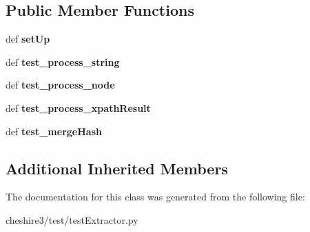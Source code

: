 \subsection*{Public Member Functions}
\begin{DoxyCompactItemize}
\item 
\hypertarget{classcheshire3_1_1test_1_1test_extractor_1_1_simple_extractor_test_case_a14d9efaa07af5961038d73f2e9fd11f6}{def {\bfseries set\-Up}}\label{classcheshire3_1_1test_1_1test_extractor_1_1_simple_extractor_test_case_a14d9efaa07af5961038d73f2e9fd11f6}

\item 
\hypertarget{classcheshire3_1_1test_1_1test_extractor_1_1_simple_extractor_test_case_a39bc2d2c8a2f591b3679b69c2201fffa}{def {\bfseries test\-\_\-process\-\_\-string}}\label{classcheshire3_1_1test_1_1test_extractor_1_1_simple_extractor_test_case_a39bc2d2c8a2f591b3679b69c2201fffa}

\item 
\hypertarget{classcheshire3_1_1test_1_1test_extractor_1_1_simple_extractor_test_case_a0d05adeb98c5d6d1c363b0402624f09f}{def {\bfseries test\-\_\-process\-\_\-node}}\label{classcheshire3_1_1test_1_1test_extractor_1_1_simple_extractor_test_case_a0d05adeb98c5d6d1c363b0402624f09f}

\item 
\hypertarget{classcheshire3_1_1test_1_1test_extractor_1_1_simple_extractor_test_case_ad193b20f5e62d9ac07d4bf438cdb3275}{def {\bfseries test\-\_\-process\-\_\-xpath\-Result}}\label{classcheshire3_1_1test_1_1test_extractor_1_1_simple_extractor_test_case_ad193b20f5e62d9ac07d4bf438cdb3275}

\item 
\hypertarget{classcheshire3_1_1test_1_1test_extractor_1_1_simple_extractor_test_case_ace4fb9fd4a5799941082b69fcdd76418}{def {\bfseries test\-\_\-merge\-Hash}}\label{classcheshire3_1_1test_1_1test_extractor_1_1_simple_extractor_test_case_ace4fb9fd4a5799941082b69fcdd76418}

\end{DoxyCompactItemize}
\subsection*{Additional Inherited Members}


The documentation for this class was generated from the following file\-:\begin{DoxyCompactItemize}
\item 
cheshire3/test/test\-Extractor.\-py\end{DoxyCompactItemize}
